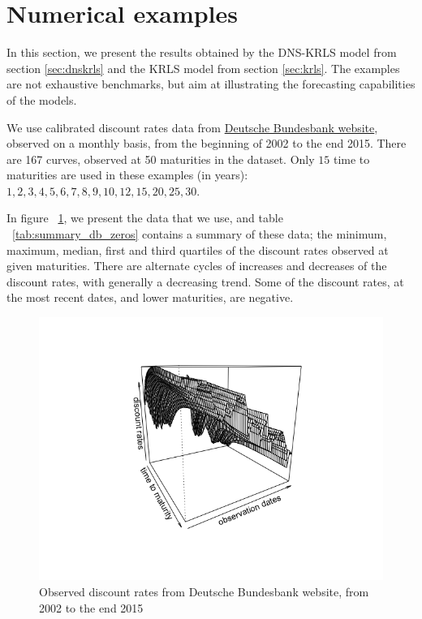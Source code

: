 
\section{Numerical examples}
\label{sec:numericalexamples}

In this section, we present the results obtained by the DNS-KRLS model from section \ref{sec:dnskrls} and the KRLS model from section \ref{sec:krls}. The examples are not exhaustive benchmarks, but aim at illustrating the forecasting capabilities of the models. 

\medskip

We use calibrated discount rates data from \textcolor{blue}{\href{http://www.bundesbank.de/Navigation/EN/Statistics/Time_series_databases/time_series_databases.html}{Deutsche Bundesbank website}}, observed on a monthly basis, from the beginning of 2002 to the end 2015. There are 167 curves, observed at 50 maturities in the dataset. Only $15$ time to maturities are used in these examples (in years): $1, 2, 3, 4, 5, 6, 7, 8, 9, 10, 12, 15, 20, 25, 30$. 

\medskip

In figure ~\ref{db_zerorates}, we present the data that we use, and table ~\ref{tab:summary_db_zeros} contains a summary of these data; the minimum, maximum, median, first and third quartiles of the discount rates observed at given maturities. There are alternate cycles of increases and decreases of the discount rates, with generally a decreasing trend. Some of the discount rates, at the most recent dates, and lower maturities, are negative.


\begin{figure}[!htb]
\centering
\includegraphics[width=14cm]{gfx/chapter-krls-models/bundesbank_dR.png}
\caption{Observed discount rates from Deutsche Bundesbank website, from 2002 to the end 2015}
\label{db_zerorates}
\end{figure}


